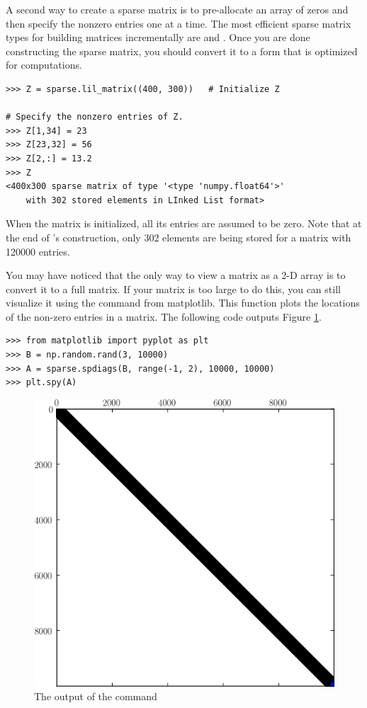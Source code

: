 A second way to create a sparse matrix is to pre-allocate an array of zeros and then specify the nonzero entries one at a time. 
The most efficient sparse matrix types for building matrices incrementally are  and . 
Once you are done constructing the sparse matrix, you should convert it to a form that is optimized for computations.


\begin{lstlisting}
>>> Z = sparse.lil_matrix((400, 300))	# Initialize Z

# Specify the nonzero entries of Z.
>>> Z[1,34] = 23
>>> Z[23,32] = 56
>>> Z[2,:] = 13.2
>>> Z
<400x300 sparse matrix of type '<type 'numpy.float64'>'
	with 302 stored elements in LInked List format>

\end{lstlisting}

When the matrix  is initialized, all its entries are assumed to be zero. 
Note that at the end of 's construction, only 302 elements are being stored for a matrix with 120000 entries. 

You may have noticed that the only way to view a matrix as a 2-D array is to convert it to a full matrix. 
If your matrix is too large to do this, you can still visualize it using the  command from matplotlib. 
This function plots the locations of the non-zero entries in a matrix. 
The following code outputs Figure \ref{fig:mpl_spy}.

\begin{lstlisting}
>>> from matplotlib import pyplot as plt
>>> B = np.random.rand(3, 10000)
>>> A = sparse.spdiags(B, range(-1, 2), 10000, 10000)
>>> plt.spy(A)
\end{lstlisting}

\begin{figure}
\centering
\includegraphics[width=.75\textwidth]{spy.png}
\caption{The output of the  command}
\label{fig:mpl_spy}
\end{figure}


